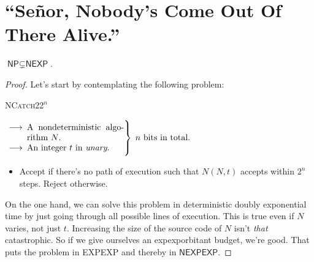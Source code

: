 \documentclass{article}
\theoremstyle{customstyle}
\newcommand{\NP}{\ensuremath{\textsf{NP}}}
\newcommand{\NEXP}{\ensuremath{\textsf{NEXP}}}
\newcommand{\NEXPEXP}{\ensuremath{\textsf{NEXPEXP}}}
\begin{document}
\section{``Se\~{n}or, Nobody's Come Out Of There Alive.''}

\begin{theorem}
$\NP \subsetneq \NEXP$.\label{NDTH}
\end{theorem}

\begin{proof}
Let's start by contemplating the following problem:
\begin{mdframed}
\textsc{NCatch22}$^n$

\noindent
$
\hspace{-1pt}
\left.\parbox{0.4\textwidth}{
\begin{itemize}[noitemsep,topsep=0.3em]
\item[$\longrightarrow$] A nondeterministic algorithm $N$.
\item[$\longrightarrow$] An integer $t$ in \textit{unary}.
\end{itemize}
}\right\}\;
\text{$n$ bits in total.}\hspace*{\fill}
$
\begin{itemize}[noitemsep,topsep=0.3em]
\item[$\longleftarrow$] Accept if there's no path of execution such that $N(N, t)$ accepts within $2^n$ steps. Reject otherwise.
\end{itemize}
\end{mdframed}
On the one hand, we can solve this problem in deterministic doubly exponential time by just going through all possible lines of execution. This is true even if $N$ varies, not just $t$. Increasing the size of the source code of $N$ isn't \textit{that} catastrophic. So if we give ourselves an expexporbitant budget, we're good. That puts the problem in \textsf{EXPEXP} and thereby in $\NEXPEXP$.


\end{proof}
\end{document}

